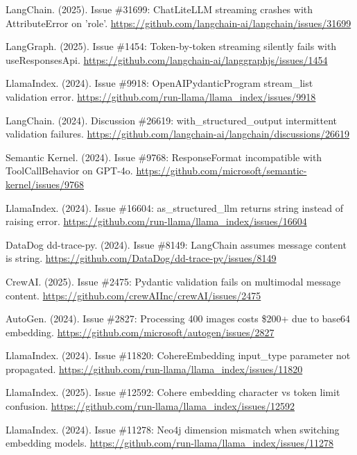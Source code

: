 \documentclass[11pt]{article}
\begin{document}
\begin{thebibliography}{99}
LangChain. (2025). Issue \#31699: ChatLiteLLM streaming crashes with AttributeError on 'role'. \url{https://github.com/langchain-ai/langchain/issues/31699}

LangGraph. (2025). Issue \#1454: Token-by-token streaming silently fails with useResponsesApi. \url{https://github.com/langchain-ai/langgraphjs/issues/1454}

LlamaIndex. (2024). Issue \#9918: OpenAIPydanticProgram stream\_list validation error. \url{https://github.com/run-llama/llama_index/issues/9918}

LangChain. (2024). Discussion \#26619: with\_structured\_output intermittent validation failures. \url{https://github.com/langchain-ai/langchain/discussions/26619}

Semantic Kernel. (2024). Issue \#9768: ResponseFormat incompatible with ToolCallBehavior on GPT-4o. \url{https://github.com/microsoft/semantic-kernel/issues/9768}

LlamaIndex. (2024). Issue \#16604: as\_structured\_llm returns string instead of raising error. \url{https://github.com/run-llama/llama_index/issues/16604}

DataDog dd-trace-py. (2024). Issue \#8149: LangChain assumes message content is string. \url{https://github.com/DataDog/dd-trace-py/issues/8149}

CrewAI. (2025). Issue \#2475: Pydantic validation fails on multimodal message content. \url{https://github.com/crewAIInc/crewAI/issues/2475}

AutoGen. (2024). Issue \#2827: Processing 400 images costs \$200+ due to base64 embedding. \url{https://github.com/microsoft/autogen/issues/2827}

LlamaIndex. (2024). Issue \#11820: CohereEmbedding input\_type parameter not propagated. \url{https://github.com/run-llama/llama_index/issues/11820}

LlamaIndex. (2025). Issue \#12592: Cohere embedding character vs token limit confusion. \url{https://github.com/run-llama/llama_index/issues/12592}

LlamaIndex. (2024). Issue \#11278: Neo4j dimension mismatch when switching embedding models. \url{https://github.com/run-llama/llama_index/issues/11278}


\end{thebibliography}
\end{document}
